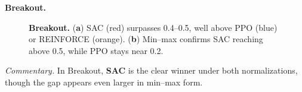 \noindent \textbf{Breakout.}
\begin{figure}[htbp]
	\centering
	\quad
	\caption{\textbf{Breakout.}
		(\textbf{a}) SAC (red) surpasses 0.4--0.5, well above PPO (blue) or REINFORCE (orange).
		(\textbf{b}) Min--max confirms SAC reaching above 0.5, while PPO stays near 0.2.}
	\label{fig:breakout_combined}
\end{figure}

\noindent
\emph{Commentary.} In Breakout, \textbf{SAC} is the clear winner under both normalizations, though the gap appears even larger in min--max form.

\medskip

